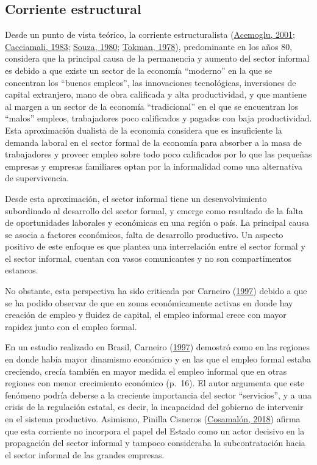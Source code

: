 \documentclass[
  letterpaper,
  12pt,
  oneside,
  spanish,
  doublespacing,
  headsepline,
  parskip]{MastersDoctoralThesis}
\begin{document}
\hypertarget{corriente-estructural}{%
\subsection{Corriente estructural}\label{corriente-estructural}}

Desde un punto de vista teórico, la corriente estructuralista
(\protect\hyperlink{ref-acemoglu2001}{Acemoglu, 2001};
\protect\hyperlink{ref-cacciamali1983}{Cacciamali, 1983};
\protect\hyperlink{ref-souza1980}{Souza, 1980};
\protect\hyperlink{ref-tokman1978}{Tokman, 1978}), predominante en los
años 80, considera que la principal causa de la permanencia y aumento
del sector informal es debido a que existe un sector de la economía
``moderno'' en la que se concentran los ``buenos empleos'', las
innovaciones tecnológicas, inversiones de capital extranjero, mano de
obra calificada y alta productividad, y que mantiene al margen a un
sector de la economía ``tradicional'' en el que se encuentran los
``malos'' empleos, trabajadores poco calificados y pagados con baja
productividad. Esta aproximación dualista de la economía considera que
es insuficiente la demanda laboral en el sector formal de la economía
para absorber a la masa de trabajadores y proveer empleo sobre todo poco
calificados por lo que las pequeñas empresas y empresas familiares optan
por la informalidad como una alternativa de supervivencia.

Desde esta aproximación, el sector informal tiene un desenvolvimiento
subordinado al desarrollo del sector formal, y emerge como resultado de
la falta de oportunidades laborales y económicas en una región o país.
La principal causa se asocia a factores económicos, falta de desarrollo
productivo. Un aspecto positivo de este enfoque es que plantea una
interrelación entre el sector formal y el sector informal, cuentan con
vasos comunicantes y no son compartimentos estancos.

No obstante, esta perspectiva ha sido criticada por Carneiro
(\protect\hyperlink{ref-carneiro1997}{1997}) debido a que se ha podido
observar de que en zonas económicamente activas en donde hay creación de
empleo y fluidez de capital, el empleo informal crece con mayor rapidez
junto con el empleo formal.

En un estudio realizado en Brasil, Carneiro
(\protect\hyperlink{ref-carneiro1997}{1997}) demostró como en las
regiones en donde había mayor dinamismo económico y en las que el empleo
formal estaba creciendo, crecía también en mayor medida el empleo
informal que en otras regiones con menor crecimiento económico (p.~16).
El autor argumenta que este fenómeno podría deberse a la creciente
importancia del sector ``servicios'', y a una crisis de la regulación
estatal, es decir, la incapacidad del gobierno de intervenir en el
sistema productivo. Asimismo, Pinilla Cisneros
(\protect\hyperlink{ref-cosamaluxf3n2018}{Cosamalón, 2018}) afirma que
esta corriente no incorpora el papel del Estado como un actor decisivo
en la propagación del sector informal y tampoco consideraba la
subcontratación hacia el sector informal de las grandes empresas.
\end{document}
